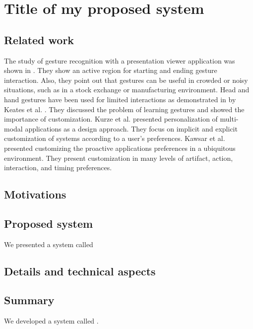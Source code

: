 \chapter{Title of my proposed system}



\section{Related work}

The study of gesture recognition with a presentation viewer application was shown in \cite{Rehm}. They show an active region for starting and ending gesture interaction. Also, they point out that gestures can be useful in crowded or noisy situations, such as in a stock exchange or manufacturing environment. Head and hand gestures have been used for limited interactions as demonstrated in by Keates et al. \cite{Rehm}. They discussed the problem of learning gestures and showed the importance of customization. Kurze et al. \cite{SGSAyman} presented personalization of multi-modal applications as a design approach. They focus on implicit and explicit customization of systems according to a user's preferences. Kawsar et al. \cite{SGSAyman} presented customizing the proactive applications preferences in a ubiquitous environment. They present customization in many levels of artifact, action, interaction, and timing preferences.


\section{Motivations }




\section{Proposed system}

We presented a system called 

\section{Details and technical aspects}
\section{Summary}
We developed a system called . 